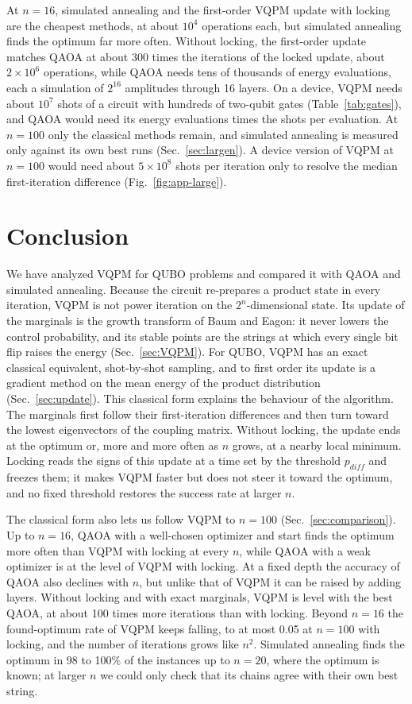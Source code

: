 \documentclass[onecolumn,10pt]{article}
\theoremstyle{remark}
\theoremstyle{plain}
\begin{document}
At $n=16$, simulated annealing and the first-order VQPM update with locking are the cheapest methods, at about $10^4$ operations each, but simulated annealing finds the optimum far more often. Without locking, the first-order update matches QAOA at about 300 times the iterations of the locked update, about $2\times10^6$ operations, while QAOA needs tens of thousands of energy evaluations, each a simulation of $2^{16}$ amplitudes through 16 layers. On a device, VQPM needs about $10^7$ shots of a circuit with hundreds of two-qubit gates (Table~\ref{tab:gates}), and QAOA would need its energy evaluations times the shots per evaluation. At $n=100$ only the classical methods remain, and simulated annealing is measured only against its own best runs (Sec.~\ref{sec:largen}). A device version of VQPM at $n=100$ would need about $5\times10^8$ shots per iteration only to resolve the median first-iteration difference (Fig.~\ref{fig:app-large}).

\FloatBarrier
\section{Conclusion}
\label{sec:conclusion}
We have analyzed VQPM for QUBO problems and compared it with QAOA and simulated annealing. Because the circuit re-prepares a product state in every iteration, VQPM is not power iteration on the $2^n$-dimensional state. Its update of the marginals is the growth transform of Baum and Eagon: it never lowers the control probability, and its stable points are the strings at which every single bit flip raises the energy (Sec.~\ref{sec:VQPM}). For QUBO, VQPM has an exact classical equivalent, shot-by-shot sampling, and to first order its update is a gradient method on the mean energy of the product distribution (Sec.~\ref{sec:update}). This classical form explains the behaviour of the algorithm. The marginals first follow their first-iteration differences and then turn toward the lowest eigenvectors of the coupling matrix. Without locking, the update ends at the optimum or, more and more often as $n$ grows, at a nearby local minimum. Locking reads the signs of this update at a time set by the threshold $p_{diff}$ and freezes them; it makes VQPM faster but does not steer it toward the optimum, and no fixed threshold restores the success rate at larger $n$.

The classical form also lets us follow VQPM to $n=100$ (Sec.~\ref{sec:comparison}). Up to $n=16$, QAOA with a well-chosen optimizer and start finds the optimum more often than VQPM with locking at every $n$, while QAOA with a weak optimizer is at the level of VQPM with locking. At a fixed depth the accuracy of QAOA also declines with $n$, but unlike that of VQPM it can be raised by adding layers. Without locking and with exact marginals, VQPM is level with the best QAOA, at about 100 times more iterations than with locking. Beyond $n=16$ the found-optimum rate of VQPM keeps falling, to at most 0.05 at $n=100$ with locking, and the number of iterations grows like $n^2$. Simulated annealing finds the optimum in 98 to 100\% of the instances up to $n=20$, where the optimum is known; at larger $n$ we could only check that its chains agree with their own best string.
\end{document}
